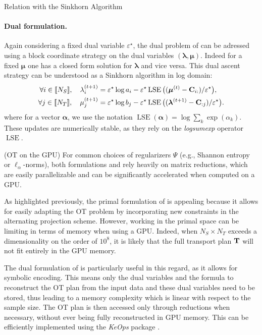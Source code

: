 \begin{mem1}{Relation with the Sinkhorn Algorithm}
    \paragraph{Dual formulation.} Again considering a fixed dual variable $\varepsilon^\star$, the dual problem of  can be adressed using a block coordinate strategy on the dual variables $(\bm{\lambda}, \bm{\mu})$. Indeed for a fixed $\bm{\mu}$ one has a closed form solution for $\bm{\lambda}$ and vice versa. This dual ascent strategy can be understood as a Sinkhorn algorithm in log domain:
    \begin{align}
        \forall i \in {[\![N_S]\!]}, \quad \lambda^{(t+1)}_i &= \varepsilon^\star \log a_i - \varepsilon^\star  \operatorname{LSE} \big((\bm{\mu}^{(t)} - \mathbf{C}_{i:}) / \varepsilon^\star \big), \\
        \forall j \in {[\![N_T]\!]}, \quad \mu^{(t+1)}_j &= \varepsilon^\star \log b_j - \varepsilon^\star  \operatorname{LSE} \big((\bm{\lambda}^{(t+1)} - \mathbf{C}_{:j}) / \varepsilon^\star \big).
    \end{align}
    where for a vector $\bm{\alpha}$, we use the notation
    $\operatorname{LSE}(\bm{\alpha}) = \log \sum_{k} \exp (\alpha_k)$. These updates are numerically stable, as they rely on the \emph{logsumexp} operator $\operatorname{LSE}$.
\end{mem1}

\begin{remark}{(OT on the GPU)}\label{remark:ot_gpu}
    For common choices of regularizers $\Psi$ (e.g., Shannon entropy or $\ell_\alpha$-norms), both formulations  and  rely heavily on matrix reductions, which are easily parallelizable and can be significantly accelerated when computed on a GPU.
    
    As highlighted previously, the primal formulation of  is appealing because it allows for easily adapting the OT problem by incorporating new constraints in the alternating projection scheme. However, working in the primal space can be limiting in terms of memory when using a GPU. Indeed, when $N_S \times N_T$ exceeds a dimensionality on the order of $10^8$, it is likely that the full transport plan ${\mathbf{T}}$ will not fit entirely in the GPU memory.
    
    The dual formulation of  is particularly useful in this regard, as it allows for symbolic encoding. This means only the dual variables and the formula to reconstruct the OT plan from the input data and these dual variables need to be stored, thus leading to a memory complexity which is linear with respect to the sample size. The OT plan is then accessed only through reductions when necessary, without ever being fully reconstructed in GPU memory. This can be efficiently implemented using the \emph{KeOps} package \citep{charlier2021kernel}.
\end{remark}
    
